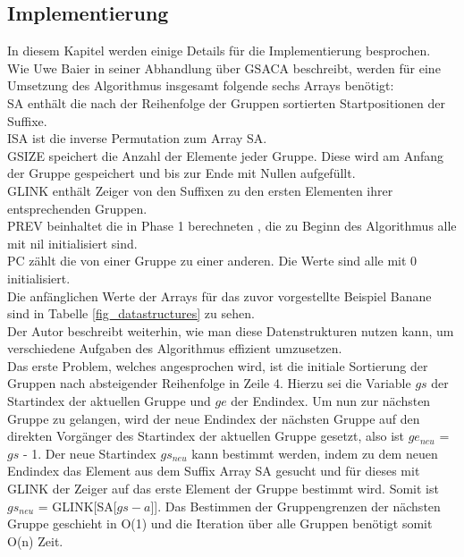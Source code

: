 \newpage
\subsection{Implementierung}
\label{gsaca:chapter5}
%
In diesem Kapitel werden einige Details für die Implementierung besprochen. \\

Wie Uwe Baier in seiner Abhandlung über GSACA beschreibt, werden für eine Umsetzung des Algorithmus insgesamt folgende sechs Arrays benötigt:\\
SA enthält die nach der Reihenfolge der Gruppen sortierten Startpositionen der Suffixe. \\
ISA ist die inverse Permutation zum Array SA. \\
GSIZE speichert die Anzahl der Elemente jeder Gruppe. 
Diese wird am Anfang der Gruppe gespeichert und bis zur Ende mit Nullen aufgefüllt.\\
GLINK enthält Zeiger von den Suffixen zu den ersten Elementen ihrer entsprechenden Gruppen. \\
PREV beinhaltet die in Phase 1 berechneten \prevpointer, die zu Beginn des Algorithmus alle mit nil initialisiert sind.\\
PC zählt die \prevpointer von einer Gruppe zu einer anderen. 
Die Werte sind alle mit 0 initialisiert.\\
Die anfänglichen Werte der Arrays für das zuvor vorgestellte Beispiel Banane sind in Tabelle \ref{fig_datastructures} zu sehen.\\



Der Autor beschreibt weiterhin, wie man diese Datenstrukturen nutzen kann, um verschiedene Aufgaben des Algorithmus effizient umzusetzen.\\

Das erste Problem, welches angesprochen wird, ist die initiale Sortierung der Gruppen nach absteigender Reihenfolge in Zeile 4. 
Hierzu sei die Variable $gs$ der Startindex der aktuellen Gruppe und $ge$ der Endindex. 
Um nun zur nächsten Gruppe zu gelangen, wird der neue Endindex der nächsten Gruppe auf den direkten Vorgänger des Startindex der aktuellen Gruppe gesetzt, also ist $ge_{neu}$ = $gs$ - 1. 
Der neue Startindex $gs_{neu}$ kann bestimmt werden, indem zu dem neuen Endindex das Element aus dem Suffix Array SA gesucht und für dieses mit GLINK der Zeiger auf das erste Element der Gruppe bestimmt wird. 
Somit ist $gs_{neu}$ = GLINK[SA[$gs - a$]]. 
Das Bestimmen der Gruppengrenzen der nächsten Gruppe geschieht in O(1) und die Iteration über alle Gruppen benötigt somit O(n) Zeit.\\


